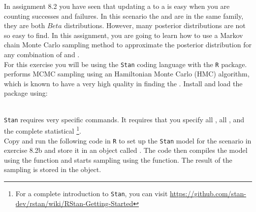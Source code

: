 \setcounter{chapter}{8}
\setcounter{section}{3}
\setcounter{question}{0}



In assignment 8.2 you have seen that updating a  to a  is easy when you are counting successes and failures. In this scenario the  and  are in the same family, they are both $Beta$ distributions. However, many posterior distributions are not so easy to find. In this assignment, you are going to learn how to use a Markov chain Monte Carlo sampling method to approximate the posterior distribution for any combination of  and . \\

For this exercise you will be using the \texttt{Stan} coding language with the  \texttt{R} package.  performs MCMC sampling using an Hamiltonian Monte Carlo (HMC) algorithm, which is known to have a very high quality in finding the . Install and load the package using: \\
\\

\texttt{Stan} requires very specific commands. It requires that you specify all , all , and the complete statistical \footnote{For a complete introduction to \texttt{Stan}, you can visit \url{https://github.com/stan-dev/rstan/wiki/RStan-Getting-Started}}. \\

Copy and run the following code in \texttt{R} to set up the \texttt{Stan} model for the scenario in exercise 8.2b and store it in an object called . The code then compiles the model using the  function and starts sampling using the  function. The result of the sampling is stored in the  object. \\


